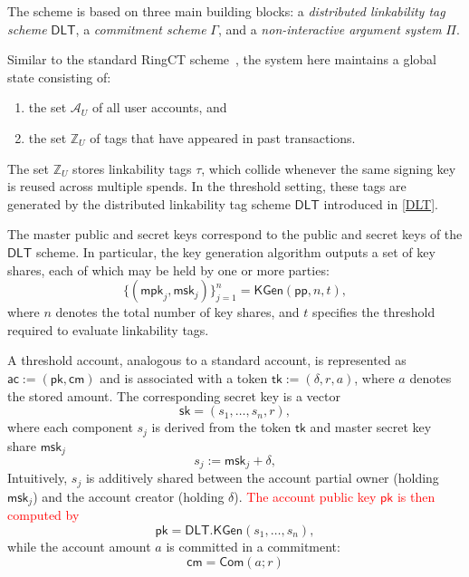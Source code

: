 The scheme is based on three main building blocks: a \emph{distributed linkability tag scheme} $\mathsf{DLT}$, a \emph{commitment scheme} $\Gamma$, and a \emph{non-interactive argument system} $\Pi$.

Similar to the standard RingCT scheme~\cite{lai2019omniring}, the system here maintains a global state consisting of:
\begin{enumerate}
    \item the set $\mathcal{A}_U$ of all user accounts, and
    \item the set $\mathbb{Z}_U$ of tags that have appeared in past transactions.
\end{enumerate}
The set $\mathbb{Z}_U$ stores linkability tags $\tau$, which collide whenever the same signing key is reused across multiple spends. In the threshold setting, these tags are generated by the distributed linkability tag scheme $\mathsf{DLT}$ introduced in \autoref{DLT}.

The master public and secret keys correspond to the public and secret keys of the $\mathsf{DLT}$ scheme. In particular, the key generation algorithm outputs a set of key shares, each of which may be held by one or more parties:
\[
    \{(\mathsf{mpk}_j, \mathsf{msk}_j)\}_{j=1}^n = \mathsf{KGen}(\mathsf{pp}, n, t),
\]
where $n$ denotes the total number of key shares, and $t$ specifies the threshold required to evaluate linkability tags.

A threshold account, analogous to a standard account, is represented as $\mathsf{ac}:= (\mathsf{pk}, \mathsf{cm})$ and is associated with a token $\mathsf{tk}:= (\delta, r, a)$, where $a$ denotes the stored amount. The corresponding secret key is a vector 
\[
    \mathsf{sk} = ( s_1, \dots, s_n,r),
\]
where each component $s_j$ is derived from the token $\mathsf{tk}$ and master secret key share $\mathsf{msk}_j$  
\[ 
    s_j := \mathsf{msk}_j + \delta,
\]
Intuitively, $s_j$ is additively shared between the account partial owner (holding $\mathsf{msk}_j$) and the account creator (holding $\delta$).
\textcolor{red}{The account public key $\mathsf{pk}$ is then computed by}
\[
    \mathsf{pk} = \mathsf{DLT.KGen}(s_1, \dots, s_n),
\]
while the account amount $a$ is committed in a commitment:
\[
    \mathsf{cm} = \mathsf{Com}(a; r)
\]



